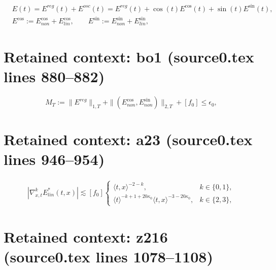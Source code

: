 \documentclass[10pt,a4paper]{amsart}
\theoremstyle{plain}
\begin{document}
	\begin{equation}\label{de1}
		\begin{split}
			&E(t)=	E^{reg}(t)+E^{osc}(t)=E^{reg}(t)+\cos(t) E^{\cos}(t)+\sin(t)E^{\sin}(t),\\
			&E^{\cos}:=E^{\cos}_{non}+E_{lin}^{\cos},\qquad E^{\sin}:=E^{\sin}_{non}+E_{lin}^{\sin},
		\end{split}
	\end{equation}


\section*{Retained context: bo1 (source0.tex lines 880--882)}

		\begin{equation}\label{bo1}
			M_T := \|E^{reg}\|_{1,T} + \|(E^{\cos}_{non},E^{\sin}_{non})\|_{2,T} + [f_0] \le \epsilon_0,
		\end{equation}


\section*{Retained context: a23 (source0.tex lines 946--954)}

		\begin{align}\label{a23}
			|\nabla_{x,t}^k E_{lin}^{\ast}(t,x)|
			\lesssim [f_0]
			\begin{cases}
				\langle t,x\rangle^{-2-k},&k\in\{0,1\},\\
				\langle t\rangle^{-k+1+20\kappa_0}
				\langle t,x\rangle^{-3-20\kappa_0},&k\in\{2,3\},
			\end{cases}
		\end{align}


\section*{Retained context: z216 (source0.tex lines 1078--1108)}
\end{document}
